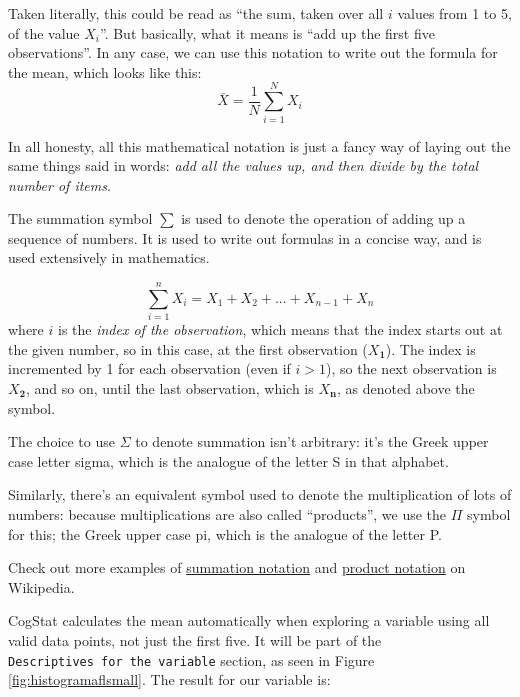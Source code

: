 \documentclass[
  11pt,
]{book}
\theoremstyle{indenteddefinition}
\theoremstyle{indenteddefinition}
\theoremstyle{definition}
\theoremstyle{definition}
\theoremstyle{remark}
\begin{document}
Taken literally, this could be read as ``the sum, taken over all \(i\) values from 1 to 5, of the value \(X_i\)''. But basically, what it means is ``add up the first five observations''. In any case, we can use this notation to write out the formula for the mean, which looks like this:
\[
\bar{X} = \frac{1}{N} \sum_{i=1}^N X_i 
\]

In all honesty, all this mathematical notation is just a fancy way of laying out the same things said in words: \emph{add all the values up, and then divide by the total number of items}.

\hypertarget{summation}{}
\begin{callout}

The summation symbol \(\scriptstyle\sum\) is used to denote the operation of adding up a sequence of numbers. It is used to write out formulas in a concise way, and is used extensively in mathematics.

\[
\sum_{i=1}^n X_i = X_1 + X_2 + ... + X_{n-1} + X_n
\]
where \(i\) is the \emph{index of the observation}, which means that the index starts out at the given number, so in this case, at the first observation (\(X_\mathbf{1}\)). The index is incremented by 1 for each observation (even if \(i>1\)), so the next observation is \(X_\mathbf{2}\), and so on, until the last observation, which is \(X_\mathbf{n}\), as denoted above the symbol.

The choice to use \(\Sigma\) to denote summation isn't arbitrary: it's the Greek upper case letter sigma, which is the analogue of the letter S in that alphabet.

Similarly, there's an equivalent symbol used to denote the multiplication of lots of numbers: because multiplications are also called ``products'', we use the \(\Pi\) symbol for this; the Greek upper case pi, which is the analogue of the letter P.

Check out more examples of \href{https://en.wikipedia.org/wiki/Summation\#Capital-sigma_notation}{summation notation} and \href{https://en.wikipedia.org/wiki/Multiplication\#Product_of_a_sequence}{product notation} on Wikipedia.

\end{callout}

CogStat calculates the mean automatically when exploring a variable using all valid data points, not just the first five. It will be part of the \texttt{Descriptives\ for\ the\ variable} section, as seen in Figure \ref{fig:histogramaflsmall}. The result for our variable is:
\end{document}
